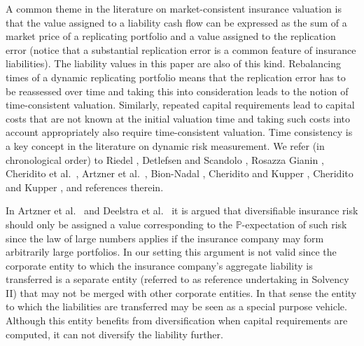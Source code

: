 \documentclass[11pt,a4paper]{article}
\renewcommand{\P}{\mathbb{P}}
\begin{document}
A common theme in the literature on market-consistent insurance valuation is that the value assigned to a liability cash flow can be expressed as the sum of a market price of a replicating portfolio and a value assigned to the replication error (notice that a substantial replication error is a common feature of insurance liabilities). The liability values in this paper are also of this kind. 
Rebalancing times of a dynamic replicating portfolio means that the replication error has to be reassessed over time and taking this into consideration leads to the notion of time-consistent valuation. Similarly, repeated capital requirements lead to capital costs that are not known at the initial valuation time and taking such costs into account appropriately also require time-consistent valuation. 
Time consistency is a key concept in the literature on dynamic risk measurement. 
We refer (in chronological order) to  
Riedel \cite{Riedel-04}, 
Detlefsen and Scandolo \cite{Detlefsen-Scandolo-05}, 
Rosazza Gianin \cite{RosazzaGianin-06}, 
Cheridito et al.~\cite{Cheridito-Delbaen-Kupper-06},  
Artzner et al.~\cite{Artzner-Delbaen-Eber-Heath-Ku-07}, 
Bion-Nadal \cite{Bion-Nadal-08}, 
Cheridito and Kupper \cite{Cheridito-Kupper-09}, 
Cheridito and Kupper \cite{Cheridito-Kupper-11}, 
and references therein. 

In Artzner et al.~\cite{Artzner-Eisele-Schmidt-20} and Deelstra et al.~\cite{Deelstra-et-al-20} it is argued that diversifiable insurance risk should only be assigned a value corresponding to the $\P$-expectation of such risk since the law of large numbers applies if the insurance company may form arbitrarily large portfolios. In our setting this argument is not valid since the corporate entity to which the insurance company's aggregate liability is transferred is a separate entity (referred to as reference undertaking in Solvency II) that may not be merged with other corporate entities. In that sense the entity to which the liabilities are transferred may be seen as a special purpose vehicle. Although this entity benefits from diversification when capital requirements are computed, it can not diversify the liability further.   
\end{document}
